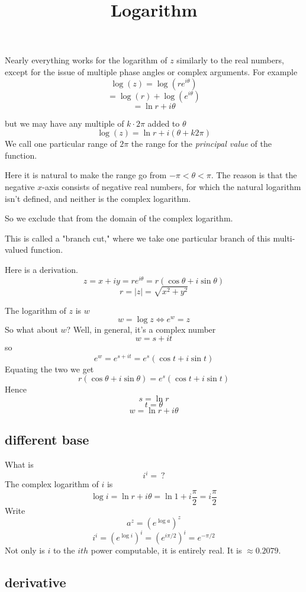 \documentclass[11pt, oneside]{article}
\title{Logarithm}
\date{}
\begin{document}
\maketitle
\Large


Nearly everything works for the logarithm of $z$ similarly to the real numbers, except for the issue of multiple phase angles or complex arguments.  For example
\[ \log(z) = \log(re^{i\theta}) \]
\[ = \log(r) + \log(e^{i\theta}) \]
\[ = \ln r + i \theta \]

but we may have any multiple of $k \cdot 2 \pi$ added to $\theta$
\[ \log(z) = \ln r + i (\theta + k2 \pi) \]
We call one particular range of $2 \pi$ the range for the \emph{principal value} of the function.  

Here it is natural to make the range go from $-\pi < \theta < \pi$.  The reason is that the negative $x$-axis consists of negative real numbers, for which the natural logarithm isn't defined, and neither is the complex logarithm.  

So we exclude that from the domain of the complex logarithm.  

This is called a "branch cut," where we take one particular branch of this multi-valued function.

Here is a derivation.  
\[ z = x + iy = re^{i\theta} = r(\cos \theta + i \sin \theta) \]
\[ r = |z| = \sqrt{x^2 + y^2} \]

The logarithm of $z$ is $w$
\[ w = \log z \iff e^w = z \]
So what about $w$? Well, in general, it's a complex number
\[ w = s + it \]
so
\[ e^w = e^{s + it} = e^s (\cos t + i \sin t) \]
Equating the two we get
\[ r (\cos \theta + i \sin \theta) = e^s (\cos t + i \sin t) \]
Hence
\[ s = \ln r \]
\[ t = \theta \]
\[ w = \ln r + i \theta \]

\subsection*{different base}

What is 
\[ i^i = \  ? \]
The complex logarithm of $i$ is
\[ \log i = \ln r + i \theta = \ln 1 + i \frac{\pi}{2} =  i \frac{\pi}{2} \]
 Write
\[ a^z = (e^{\log a})^z \]
\[ i^i = (e^{\log i})^i = (e^{i \pi/2})^i = e^{-\pi/2} \]
Not only is $i$ to the $ith$ power computable, it is entirely real.  It is $\approx 0.2079$.
\subsection*{derivative}
\end{document}

